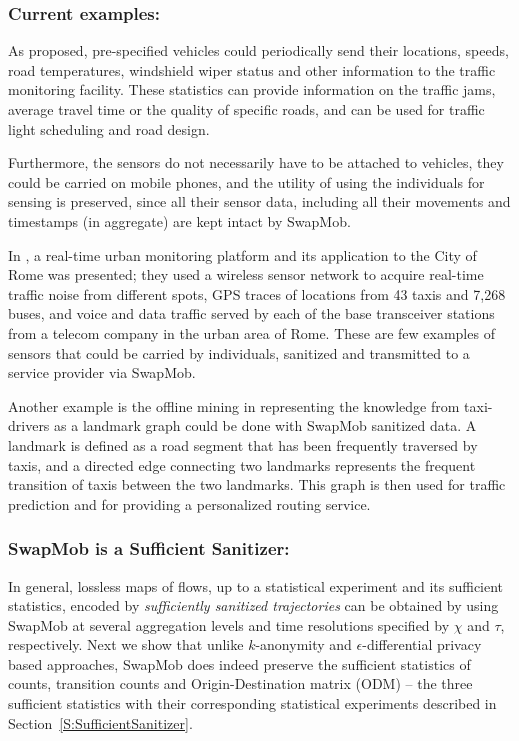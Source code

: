 \subsubsection{Current examples:}
As \cite{Hoh2005} proposed, pre-specified vehicles could periodically send their locations, speeds, road temperatures, windshield wiper status and other information to the traffic monitoring facility. These statistics can provide information on the traffic jams, average travel time or the quality of specific roads, and can be used for traffic light scheduling and road design.

Furthermore, the sensors do not necessarily have to be attached to vehicles, they could be carried on mobile phones, and the utility of using the individuals for sensing is preserved, since all their sensor data, including all their movements and timestamps (in aggregate) are kept intact by SwapMob.


In \cite{Calabrese2011}, a real-time urban monitoring platform and its application to the City of Rome was presented; they used
a wireless sensor network to acquire real-time traffic noise from different spots, GPS traces of locations from 43 taxis and 7,268 buses, and voice and data traffic served by each of the base transceiver stations from a telecom company in the urban area of Rome. These are few examples of sensors that could be carried by individuals, sanitized and transmitted to a service provider via SwapMob.

Another example is the offline mining in \cite{Yuan2011} representing the knowledge from taxi-drivers as a landmark graph could be done with SwapMob sanitized data. A landmark is defined as a road segment that has been frequently traversed by taxis, and a directed edge connecting two landmarks represents the frequent transition of taxis between the two landmarks. This graph is then used for traffic prediction and for providing a personalized routing service.

\subsubsection{SwapMob is a Sufficient Sanitizer:}
In general, lossless maps of flows, up to a statistical experiment and its sufficient statistics, encoded by {\em sufficiently sanitized trajectories} can be obtained by using SwapMob at several aggregation levels and time resolutions specified by $\chi$ and $\tau$, respectively.  
Next we show that unlike $k$-anonymity and $\epsilon$-differential privacy based approaches, SwapMob does indeed preserve the sufficient statistics of counts, transition counts and Origin-Destination matrix (ODM) -- the three sufficient statistics with their corresponding statistical experiments described in Section~\ref{S:SufficientSanitizer}.

